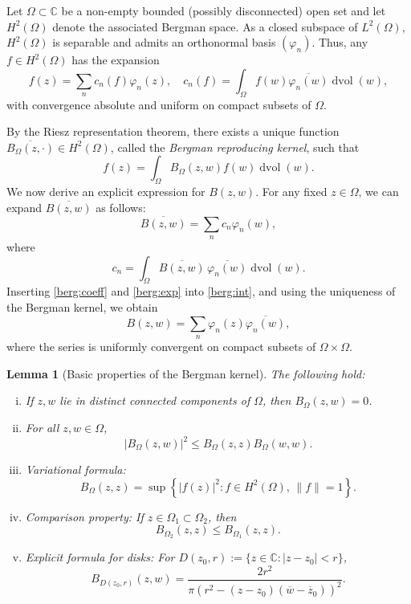 \documentclass[12pt,letterpaper]{amsart}
\theoremstyle{plain}
\newtheorem{lemma}[prop]{Lemma}
\theoremstyle{definition}
\theoremstyle{remark}
\newcommand{\CC}{\mathbb{C}}
\DeclareMathOperator{\dvol}{dvol}
\begin{document}
Let $\Omega \subset \CC$ be a non-empty bounded (possibly disconnected) open set and let $H^2(\Omega)$ denote the associated Bergman space. As a closed subspace of $L^2(\Omega)$, $H^2(\Omega)$ is separable and admits an orthonormal basis $(\varphi_n)$. Thus, any $f \in H^2(\Omega)$ has the expansion
\[
f(z) = \sum_n c_n(f) \varphi_n(z), \quad
c_n(f) = \int_\Omega f(w) \overline{\varphi_n(w)} \dvol(w),
\]
with convergence absolute and uniform on compact subsets of $\Omega$.

By the Riesz representation theorem, there exists a unique function $\overline{B_\Omega(z,\cdot)} \in H^2(\Omega)$, called the \textit{Bergman reproducing kernel}, such that
\begin{equation}\label{berg:int}
f(z) = \int_\Omega B_\Omega(z,w) f(w) \dvol(w).
\end{equation}
We now derive an explicit expression for $B(z,w)$. For any fixed $z\in \Omega$, we can expand $\overline{B(z,w)}$ as follows:
\begin{equation}\label{berg:exp}
\overline{B(z,w)} = \sum_n c_n \varphi_n(w), 
\end{equation}
where 
\begin{equation}\label{berg:coeff}
c_n = \int_\Omega \overline{B(z,w)} \, \overline{\varphi_n(w)} \dvol(w).
\end{equation}
Inserting \eqref{berg:coeff} and \eqref{berg:exp} into \eqref{berg:int}, and using the uniqueness of the Bergman kernel, we obtain
\begin{equation}\label{eq:formulaBergmann}
B(z,w) = \sum_n \varphi_n(z) \overline{\varphi_n(w)},
\end{equation}
where the series is uniformly convergent on compact subsets of $ \Omega\times \Omega. $

\begin{lemma}[Basic properties of the Bergman kernel]\label{lem:BergmanBasicProp}
The following hold:
\begin{enumerate}[(i)]
\item \label{part:bergmanDiffComp} If $z, w$ lie in distinct connected components of $\Omega$, then $B_\Omega(z,w) = 0$.

\item \label{part:bergmanIneq} For all $z, w \in \Omega$,
\[
|B_\Omega(z,w)|^2 \le B_\Omega(z,z) B_\Omega(w,w).
\]

\item \label{part:bergmanVariational} Variational formula:
\[
B_\Omega(z,z) = \sup\left\{ |f(z)|^2 : f \in H^2(\Omega),\, \|f\| = 1 \right\}.
\]

\item \label{part:bergmanComp} Comparison property: If $z \in \Omega_1 \subset \Omega_2$, then
\[
B_{\Omega_2}(z,z) \le B_{\Omega_1}(z,z).
\]

\item \label{part:bergmanDisk} Explicit formula for disks:
For $D(z_0,r) := \{ z \in \CC : |z - z_0| < r \}$,
\[
B_{D(z_0,r)}(z,w) = \frac{2r^2}{\pi \left( r^2 - (z - z_0)(\overline{w} - \overline{z}_0) \right)^2}.
\]
\end{enumerate}
\end{lemma}
\end{document}
